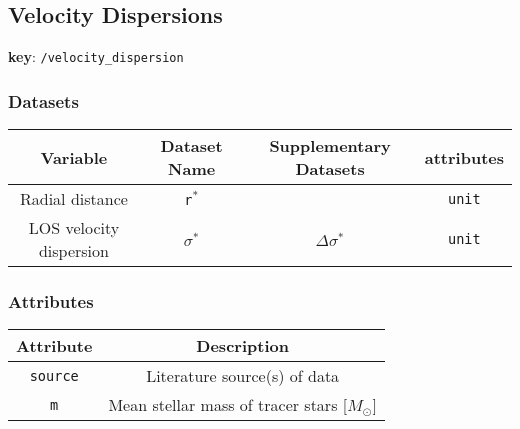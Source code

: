 \subsection{Velocity Dispersions}

\textbf{key}: \texttt{/velocity\_dispersion}

\subsubsection{Datasets}

\begin{center}
\begin{table}[H]
\begin{tabular}{ | c | c | c | c | }
    \hline
    Variable & Dataset Name & Supplementary Datasets &  attributes \\
    \hline\hline
    Radial distance & \texttt{r\(^*\)} & & \texttt{unit} \\
    \hline
    LOS velocity dispersion & \texttt{\(\sigma^*\)} & \texttt{\(\Delta\sigma^*\)} &
    \texttt{unit}\\
    \hline
\end{tabular}
\end{table}
\end{center}

\subsubsection{Attributes}


\begin{center}
\begin{table}[H]
\begin{tabular}{ | c | c | }
    \hline
    Attribute & Description \\
    \hline\hline
    \texttt{source} & Literature source(s) of data \\
    \hline
    \texttt{m} & Mean stellar mass of tracer stars [\(M_\odot\)] \\
    \hline
\end{tabular}
\end{table}
\end{center}
